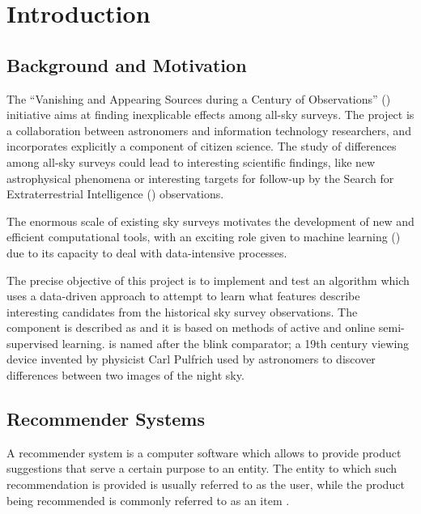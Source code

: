 \section{Introduction} \label{sect:intro}

\subsection{Background and Motivation} \label{subsect:intro:background}

The ``Vanishing and Appearing Sources during a Century of Observations'' (\vasco) initiative aims at finding inexplicable effects among all-sky surveys. The \vasco project is a collaboration between astronomers and information technology researchers, and incorporates explicitly a component of citizen science. The study of differences among all-sky surveys could lead to interesting scientific findings, like new astrophysical phenomena or interesting targets for follow-up by the Search for Extraterrestrial Intelligence (\seti) observations.

The enormous scale of existing sky surveys motivates the development of new and efficient computational tools, with an exciting role given to machine learning (\ml) due to its capacity to deal with data-intensive processes.

The precise objective of this project is to implement and test an \ml algorithm which uses a data-driven approach to attempt to learn what features describe interesting candidates from the historical sky survey observations. The \ml component is described as \mlblink and it is based on methods of active and online semi-supervised learning. \mlblink is named after the blink comparator; a 19th century viewing device invented by physicist Carl Pulfrich used by astronomers to discover differences between two images of the night sky.

\subsection{Recommender Systems} \label{subsect:intro:recommender-systems}

A recommender system is a computer software which allows to provide product suggestions that serve a certain purpose to an entity. The entity to which such recommendation is provided is usually referred to as the user, while the product being recommended is commonly referred to as an item \cite{book:rs}.

